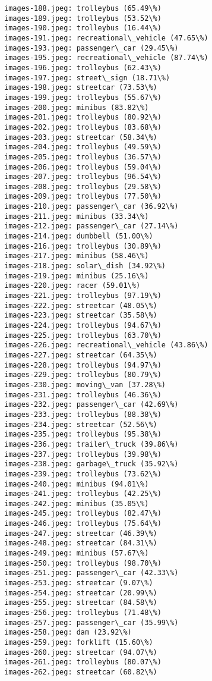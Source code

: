 \documentclass[11pt]{article}
\begin{document}
\begin{Verbatim}[commandchars=\\\{\}]
images-188.jpeg: trolleybus (65.49\%)
images-189.jpeg: trolleybus (53.52\%)
images-190.jpeg: trolleybus (16.44\%)
images-191.jpeg: recreational\_vehicle (47.65\%)
images-193.jpeg: passenger\_car (29.45\%)
images-195.jpeg: recreational\_vehicle (87.74\%)
images-196.jpeg: trolleybus (62.43\%)
images-197.jpeg: street\_sign (18.71\%)
images-198.jpeg: streetcar (73.53\%)
images-199.jpeg: trolleybus (55.67\%)
images-200.jpeg: minibus (83.82\%)
images-201.jpeg: trolleybus (80.92\%)
images-202.jpeg: trolleybus (83.68\%)
images-203.jpeg: streetcar (58.34\%)
images-204.jpeg: trolleybus (49.59\%)
images-205.jpeg: trolleybus (36.57\%)
images-206.jpeg: trolleybus (59.04\%)
images-207.jpeg: trolleybus (96.54\%)
images-208.jpeg: trolleybus (29.58\%)
images-209.jpeg: trolleybus (77.50\%)
images-210.jpeg: passenger\_car (36.92\%)
images-211.jpeg: minibus (33.34\%)
images-212.jpeg: passenger\_car (27.14\%)
images-214.jpeg: dumbbell (51.00\%)
images-216.jpeg: trolleybus (30.89\%)
images-217.jpeg: minibus (58.46\%)
images-218.jpeg: solar\_dish (34.92\%)
images-219.jpeg: minibus (25.16\%)
images-220.jpeg: racer (59.01\%)
images-221.jpeg: trolleybus (97.19\%)
images-222.jpeg: streetcar (48.05\%)
images-223.jpeg: streetcar (35.58\%)
images-224.jpeg: trolleybus (94.67\%)
images-225.jpeg: trolleybus (63.70\%)
images-226.jpeg: recreational\_vehicle (43.86\%)
images-227.jpeg: streetcar (64.35\%)
images-228.jpeg: trolleybus (94.97\%)
images-229.jpeg: trolleybus (80.79\%)
images-230.jpeg: moving\_van (37.28\%)
images-231.jpeg: trolleybus (46.36\%)
images-232.jpeg: passenger\_car (42.69\%)
images-233.jpeg: trolleybus (88.38\%)
images-234.jpeg: streetcar (52.56\%)
images-235.jpeg: trolleybus (95.38\%)
images-236.jpeg: trailer\_truck (39.86\%)
images-237.jpeg: trolleybus (39.98\%)
images-238.jpeg: garbage\_truck (35.92\%)
images-239.jpeg: trolleybus (73.62\%)
images-240.jpeg: minibus (94.01\%)
images-241.jpeg: trolleybus (42.25\%)
images-242.jpeg: minibus (35.05\%)
images-245.jpeg: trolleybus (82.47\%)
images-246.jpeg: trolleybus (75.64\%)
images-247.jpeg: streetcar (46.39\%)
images-248.jpeg: streetcar (84.31\%)
images-249.jpeg: minibus (57.67\%)
images-250.jpeg: trolleybus (98.70\%)
images-251.jpeg: passenger\_car (42.33\%)
images-253.jpeg: streetcar (9.07\%)
images-254.jpeg: streetcar (20.99\%)
images-255.jpeg: streetcar (84.58\%)
images-256.jpeg: trolleybus (71.48\%)
images-257.jpeg: passenger\_car (35.99\%)
images-258.jpeg: dam (23.92\%)
images-259.jpeg: forklift (15.60\%)
images-260.jpeg: streetcar (94.07\%)
images-261.jpeg: trolleybus (80.07\%)
images-262.jpeg: streetcar (60.82\%)

\end{Verbatim}
\end{document}
